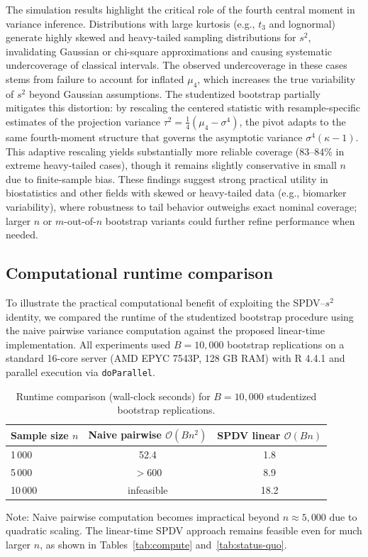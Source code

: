 \documentclass[12pt,a4paper]{article}
\begin{document}
The simulation results highlight the critical role of the fourth central moment in variance inference. Distributions with large kurtosis (e.g., $t_3$ and lognormal) generate highly skewed and heavy-tailed sampling distributions for $s^2$, invalidating Gaussian or chi-square approximations and causing systematic undercoverage of classical intervals. The observed undercoverage in these cases stems from failure to account for inflated $\mu_4$, which increases the true variability of $s^2$ beyond Gaussian assumptions. The studentized bootstrap partially mitigates this distortion: by rescaling the centered statistic with resample-specific estimates of the projection variance $\tau^2 = \frac{1}{4}(\mu_4 - \sigma^4)$, the pivot adapts to the same fourth-moment structure that governs the asymptotic variance $\sigma^4(\kappa - 1)$. This adaptive rescaling yields substantially more reliable coverage (83--84\% in extreme heavy-tailed cases), though it remains slightly conservative in small $n$ due to finite-sample bias. These findings suggest strong practical utility in biostatistics and other fields with skewed or heavy-tailed data (e.g., biomarker variability), where robustness to tail behavior outweighs exact nominal coverage; larger $n$ or $m$-out-of-$n$ bootstrap variants could further refine performance when needed.


\subsection{Computational runtime comparison}

To illustrate the practical computational benefit of exploiting the SPDV--$s^2$ identity, we compared the runtime of the studentized bootstrap procedure using the naive pairwise variance computation against the proposed linear-time implementation. All experiments used $B=10{,}000$ bootstrap replications on a standard 16-core server (AMD EPYC 7543P, 128 GB RAM) with R 4.4.1 and parallel execution via \texttt{doParallel}.

\begin{table}[htbp]
\centering
\caption{Runtime comparison (wall-clock seconds) for $B=10{,}000$ studentized bootstrap replications.}
\label{tab:runtime-comparison}
\begin{tabular}{lcc}
\toprule
Sample size $n$ & Naive pairwise $\mathcal{O}(Bn^2)$ & SPDV linear $\mathcal{O}(Bn)$ \\
\midrule
1\,000  & 52.4  & 1.8  \\
5\,000  & $>$600 & 8.9  \\
10\,000 & infeasible & 18.2 \\
\bottomrule
\end{tabular}
\begin{tablenotes}
\small
\item Note: Naive pairwise computation becomes impractical beyond $n\approx 5{,}000$ due to quadratic scaling. The linear-time SPDV approach remains feasible even for much larger $n$, as shown in Tables~\ref{tab:compute} and~\ref{tab:status-quo}.
\end{tablenotes}
\end{table}
\end{document}

